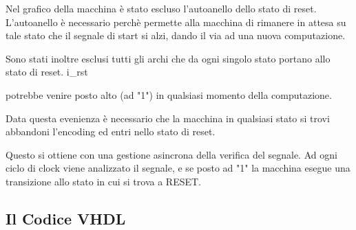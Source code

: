 \documentclass{article}
\newenvironment{gitFont}{\fontfamily{zi4}\selectfont}{\par}
\begin{document}
\begin{flushleft}


Nel grafico della macchina è stato escluso l'autoanello dello stato di reset. L'autoanello è necessario perchè permette alla macchina di rimanere in attesa su tale stato che il segnale di start si alzi, dando il via ad una nuova computazione.
\smallskip

 Sono stati inoltre esclusi tutti gli archi che da ogni singolo stato portano allo stato di reset.
\begin{gitFont}i{\_}rst \end{gitFont} potrebbe venire posto alto (ad "1") in qualsiasi momento della computazione. 
\smallskip

Data questa evenienza è necessario che la macchina in qualsiasi stato si trovi abbandoni l'encoding ed entri nello stato di reset. 
\smallskip

Questo si ottiene con una gestione asincrona della verifica del segnale. 
Ad ogni ciclo di clock viene analizzato il segnale, e se posto ad "1" la macchina esegue una transizione allo stato in cui si trova a RESET.


\end{flushleft}

\subsection{Il Codice VHDL}
\end{document}
